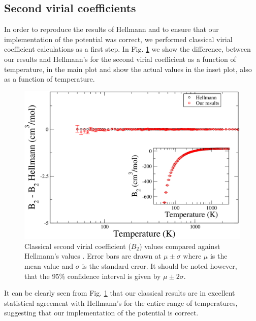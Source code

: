     \subsection{Second virial coefficients}
        In order to reproduce the results of Hellmann and to ensure that our implementation of the \abinitio{} potential was correct, we performed classical virial coefficient calculations as a first step. In Fig. \ref{fig:B2CLN2} we show the difference, between our results and Hellmann's for the second virial coefficient as a function of temperature, in the main plot and show the actual values in the inset plot, also as a function of temperature.
        \begin{figure}[!htbp]
            \centering
            \includegraphics[scale=0.20,keepaspectratio]{Chapter-5/Figures/B2CL9sResultsAll.png}
            \caption{Classical second virial coefficient ($B_2$) values compared against Hellmann's values \cite{Hellmann2013}. Error bars are drawn at $\mu \pm \sigma$ where $\mu$ is the mean value and $\sigma$ is the standard error. It should be noted however, that the 95\% confidence interval is given by $\mu \pm 2\sigma$.}
            \label{fig:B2CLN2}
        \end{figure}
        It can be clearly seen from Fig. \ref{fig:B2CLN2} that our classical results are in excellent statistical agreement with Hellmann's for the entire range of temperatures, suggesting that our implementation of the \abinitio{} potential is correct.

